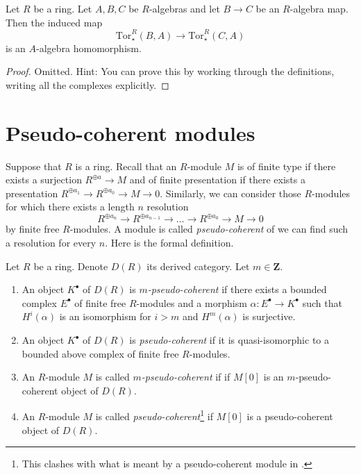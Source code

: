 \begin{lemma}
\label{lemma-functoriality-product-tor}
Let $R$ be a ring. Let $A, B, C$ be $R$-algebras and let $B \to C$ be an
$R$-algebra map. Then the induced map
$$
\text{Tor}^R_{\star}(B, A)
\longrightarrow
\text{Tor}^R_{\star}(C, A)
$$
is an $A$-algebra homomorphism.
\end{lemma}

\begin{proof}
Omitted. Hint: You can prove this by working through the definitions,
writing all the complexes explicitly.
\end{proof}










\section{Pseudo-coherent modules}
\label{section-pseudo-coherent}

\noindent
Suppose that $R$ is a ring. Recall that an $R$-module $M$ is of finite type
if there exists a surjection $R^{\oplus a} \to M$ and of finite presentation
if there exists a presentation
$R^{\oplus a_1} \to R^{\oplus a_0} \to M \to 0$.
Similarly, we can consider those $R$-modules for which there exists
a length $n$ resolution
\begin{equation}
\label{equation-pseudo-coherent}
R^{\oplus a_n} \to R^{\oplus a_{n - 1}} \to \ldots \to R^{\oplus a_0} \to
M \to 0
\end{equation}
by finite free $R$-modules. A module is called {\it pseudo-coherent}
of we can find such a resolution for every $n$. Here is the formal
definition.

\begin{definition}
\label{definition-pseudo-coherent}
Let $R$ be a ring. Denote $D(R)$ its derived category.
Let $m \in \mathbf{Z}$.
\begin{enumerate}
\item An object $K^\bullet$ of $D(R)$ is {\it $m$-pseudo-coherent}
if there exists a bounded complex $E^\bullet$ of finite free $R$-modules
and a morphism $\alpha : E^\bullet \to K^\bullet$ such that
$H^i(\alpha)$ is an isomorphism for $i > m$ and $H^m(\alpha)$
is surjective.
\item An object $K^\bullet$ of $D(R)$ is {\it pseudo-coherent}
if it is quasi-isomorphic to a bounded above complex of finite
free $R$-modules.
\item An $R$-module $M$ is called {\it $m$-pseudo-coherent} if
if $M[0]$ is an $m$-pseudo-coherent object of $D(R)$.
\item An $R$-module $M$ is called
{\it pseudo-coherent}\footnote{This clashes with what is meant by
a pseudo-coherent module in \cite{Bourbaki-CA}.}
if $M[0]$ is a pseudo-coherent object of $D(R)$.
\end{enumerate}
\end{definition}

